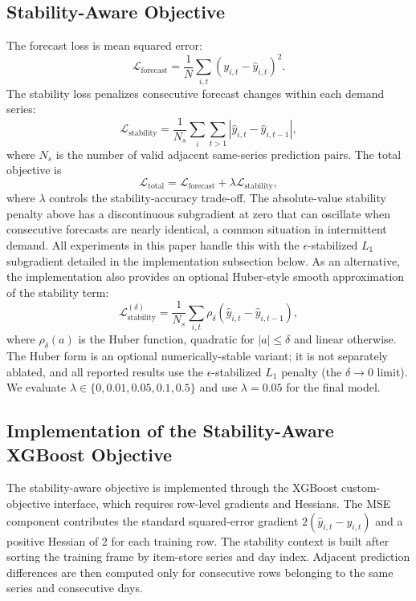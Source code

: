 \documentclass[10pt,conference]{IEEEtran}
\begin{document}
\subsection{Stability-Aware Objective}
The forecast loss is mean squared error:
\begin{equation}
\mathcal{L}_{\mathrm{forecast}} = \frac{1}{N}\sum_{i,t}(y_{i,t} - \hat{y}_{i,t})^2.
\end{equation}
The stability loss penalizes consecutive forecast changes within each demand series:
\begin{equation}
\mathcal{L}_{\mathrm{stability}} = \frac{1}{N_s}\sum_i\sum_{t>1} \left|\hat{y}_{i,t} - \hat{y}_{i,t-1}\right|,
\end{equation}
where $N_s$ is the number of valid adjacent same-series prediction pairs. The total objective is
\begin{equation}
\mathcal{L}_{\mathrm{total}} = \mathcal{L}_{\mathrm{forecast}} + \lambda \mathcal{L}_{\mathrm{stability}},
\end{equation}
where $\lambda$ controls the stability-accuracy trade-off. The absolute-value stability penalty above has a discontinuous subgradient at zero that can oscillate when consecutive forecasts are nearly identical, a common situation in intermittent demand. All experiments in this paper handle this with the $\epsilon$-stabilized $L_1$ subgradient detailed in the implementation subsection below. As an alternative, the implementation also provides an optional Huber-style smooth approximation of the stability term:
\begin{equation}
\mathcal{L}_{\mathrm{stability}}^{(\delta)} = \frac{1}{N_s}\sum_{i,t} \rho_{\delta}(\hat{y}_{i,t} - \hat{y}_{i,t-1}),
\end{equation}
where $\rho_{\delta}(a)$ is the Huber function, quadratic for $|a| \le \delta$ and linear otherwise. The Huber form is an optional numerically-stable variant; it is not separately ablated, and all reported results use the $\epsilon$-stabilized $L_1$ penalty (the $\delta \to 0$ limit). We evaluate $\lambda \in \{0,0.01,0.05,0.1,0.5\}$ and use $\lambda=0.05$ for the final model.

\subsection{Implementation of the Stability-Aware XGBoost Objective}
The stability-aware objective is implemented through the XGBoost custom-objective interface, which requires row-level gradients and Hessians. The MSE component contributes the standard squared-error gradient $2(\hat{y}_{i,t}-y_{i,t})$ and a positive Hessian of 2 for each training row. The stability context is built after sorting the training frame by item-store series and day index. Adjacent prediction differences are then computed only for consecutive rows belonging to the same series and consecutive days.
\end{document}
